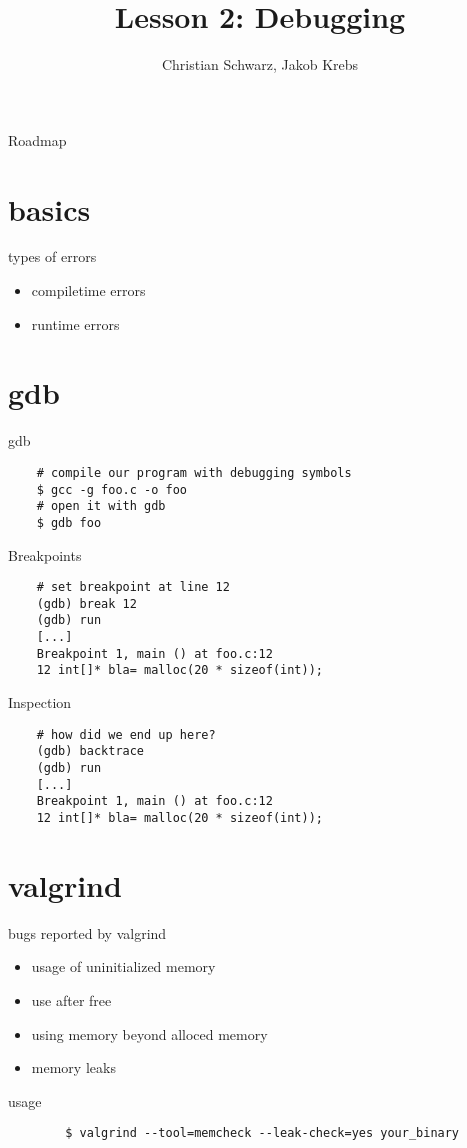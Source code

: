 \documentclass[10pt,graphics,aspectratio=169,table]{beamer}
\title{Lesson 2: Debugging} \author{Christian Schwarz, Jakob Krebs}
\begin{document}
\maketitle
\begin{frame}{Roadmap}
  \tableofcontents
\end{frame}
\section{basics}
\begin{frame}{types of errors}
  \begin{itemize}
  \item compiletime errors
  \item runtime errors
  \end{itemize}
\end{frame}
\section{gdb}
\begin{frame}[fragile]{gdb}
\begin{lstlisting}
    # compile our program with debugging symbols
    $ gcc -g foo.c -o foo
    # open it with gdb
    $ gdb foo
\end{lstlisting}
\end{frame}
\begin{frame}[fragile]{Breakpoints}
\begin{lstlisting}
    # set breakpoint at line 12
    (gdb) break 12
    (gdb) run
    [...]
    Breakpoint 1, main () at foo.c:12
    12 int[]* bla= malloc(20 * sizeof(int));
\end{lstlisting}
\end{frame}
\begin{frame}[fragile]{Inspection}
\begin{lstlisting}
    # how did we end up here?
    (gdb) backtrace
    (gdb) run
    [...]
    Breakpoint 1, main () at foo.c:12
    12 int[]* bla= malloc(20 * sizeof(int));
\end{lstlisting}
\end{frame}
\section{valgrind}
\begin{frame}{bugs reported by valgrind}
  \begin{itemize}
  \item usage of uninitialized memory
  \item use after free
  \item using memory beyond alloced memory
  \item memory leaks
  \end{itemize}
\end{frame}
\begin{frame}[fragile]{usage}
\begin{lstlisting}
        $ valgrind --tool=memcheck --leak-check=yes your_binary
\end{lstlisting}
\end{frame}
\end{document}
